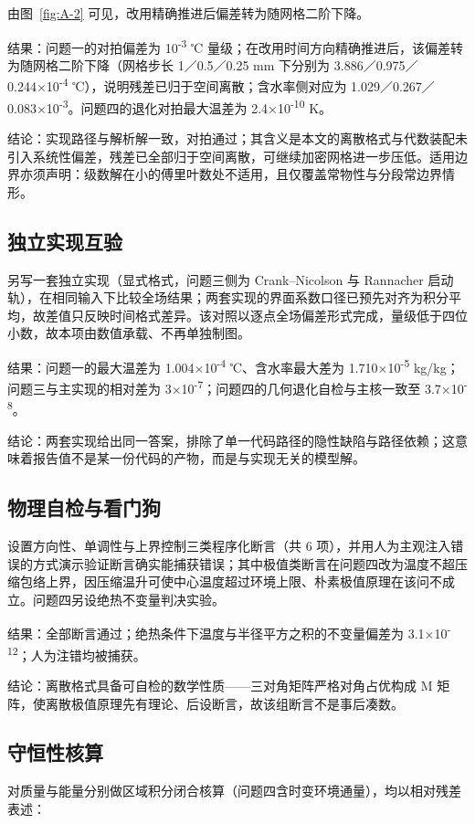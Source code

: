 由图~\ref{fig:A-2} 可见，改用精确推进后偏差转为随网格二阶下降。

结果：问题一的对拍偏差为 10\textsuperscript{-3} ℃ 量级；在改用时间方向精确推进后，该偏差转为随网格二阶下降（网格步长 1／0.5／0.25 mm 下分别为 3.886／0.975／0.244×10\textsuperscript{-4} ℃），说明残差已归于空间离散；含水率侧对应为 1.029／0.267／0.083×10\textsuperscript{-3}。问题四的退化对拍最大温差为 2.4×10\textsuperscript{-10} K。

结论：实现路径与解析解一致，对拍通过；其含义是本文的离散格式与代数装配未引入系统性偏差，残差已全部归于空间离散，可继续加密网格进一步压低。适用边界亦须声明：级数解在小的傅里叶数处不适用，且仅覆盖常物性与分段常边界情形。

\subsection{独立实现互验}
另写一套独立实现（显式格式，问题三侧为 Crank–Nicolson 与 Rannacher 启动轨），在相同输入下比较全场结果；两套实现的界面系数口径已预先对齐为积分平均，故差值只反映时间格式差异。该对照以逐点全场偏差形式完成，量级低于四位小数，故本项由数值承载、不再单独制图。

结果：问题一的最大温差为 1.004×10\textsuperscript{-4} ℃、含水率最大差为 1.710×10\textsuperscript{-5} kg/kg；问题三与主实现的相对差为 3×10\textsuperscript{-7}；问题四的几何退化自检与主核一致至 3.7×10\textsuperscript{-8}。

结论：两套实现给出同一答案，排除了单一代码路径的隐性缺陷与路径依赖；这意味着报告值不是某一份代码的产物，而是与实现无关的模型解。

\subsection{物理自检与看门狗}
设置方向性、单调性与上界控制三类程序化断言（共 6 项），并用人为主观注入错误的方式演示验证断言确实能捕获错误；其中极值类断言在问题四改为温度不超压缩包络上界，因压缩温升可使中心温度超过环境上限、朴素极值原理在该问不成立。问题四另设绝热不变量判决实验。

结果：全部断言通过；绝热条件下温度与半径平方之积的不变量偏差为 3.1×10\textsuperscript{-12}；人为注错均被捕获。

结论：离散格式具备可自检的数学性质——三对角矩阵严格对角占优构成 M 矩阵，使离散极值原理先有理论、后设断言，故该组断言不是事后凑数。

\subsection{守恒性核算}
对质量与能量分别做区域积分闭合核算（问题四含时变环境通量），均以相对残差表述：

